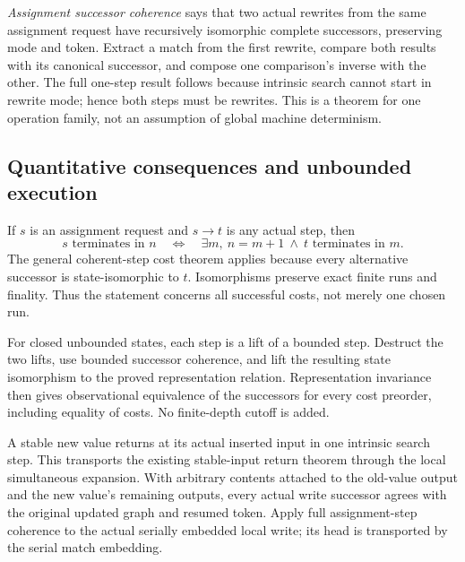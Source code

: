 
\emph{Assignment successor coherence} says that two actual rewrites from the
same assignment request have recursively isomorphic complete successors,
preserving mode and token. Extract a match from the first rewrite, compare
both results with its canonical successor, and compose one comparison's
inverse with the other. The full one-step result follows because intrinsic
search cannot start in rewrite mode; hence both steps must be rewrites.
This is a theorem for one operation family, not an assumption of global
machine determinism.



\subsection{Quantitative consequences and unbounded execution}

If $s$ is an assignment request and $s\to t$ is any actual step, then
\[
 s\text{ terminates in }n
 \quad\Longleftrightarrow\quad
 \exists m,\ n=m+1\ \land\ t\text{ terminates in }m.
\]
The general coherent-step cost theorem applies because every alternative
successor is state-isomorphic to $t$. Isomorphisms preserve exact finite runs
and finality. Thus the statement concerns all successful costs, not merely
one chosen run.


For closed unbounded states, each step is a lift of a bounded step.
Destruct the two lifts, use bounded successor coherence, and lift the resulting
state isomorphism to the proved representation relation. Representation
invariance then gives observational equivalence of the successors for every
cost preorder, including equality of costs. No finite-depth cutoff is added.



A stable new value returns at its actual inserted input in one intrinsic
search step. This transports the existing stable-input return theorem through
the local simultaneous expansion. With arbitrary contents attached to the
old-value output and the new value's remaining outputs, every actual write
successor agrees with the original updated graph and resumed token. Apply
full assignment-step coherence to the actual serially embedded local write;
its head is transported by the serial match embedding.

